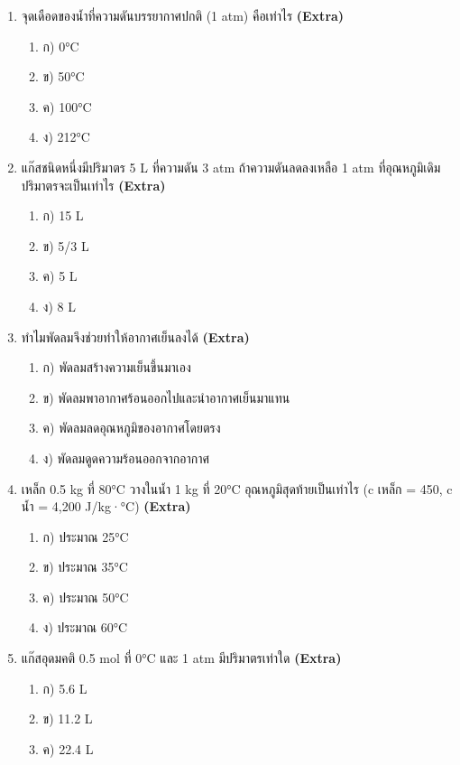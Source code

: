 \documentclass[12pt]{article}
\begin{document}
\begin{enumerate}[label=\arabic*.]
\begin{enumerate}[label=)]
\item ค) 49.2 L
\item ง) 6.15 L
\end{enumerate}
\item จุดเดือดของน้ำที่ความดันบรรยากาศปกติ (1 atm) คือเท่าไร \hfill \textbf{\small (Extra)}
\begin{enumerate}[label=)]
\item ก) 0°C
\item ข) 50°C
\item ค) 100°C
\item ง) 212°C
\end{enumerate}
\item แก๊สชนิดหนึ่งมีปริมาตร 5 L ที่ความดัน 3 atm ถ้าความดันลดลงเหลือ 1 atm ที่อุณหภูมิเดิม ปริมาตรจะเป็นเท่าไร \hfill \textbf{\small (Extra)}
\begin{enumerate}[label=)]
\item ก) 15 L
\item ข) 5/3 L
\item ค) 5 L
\item ง) 8 L
\end{enumerate}
\item ทำไมพัดลมจึงช่วยทำให้อากาศเย็นลงได้ \hfill \textbf{\small (Extra)}
\begin{enumerate}[label=)]
\item ก) พัดลมสร้างความเย็นขึ้นมาเอง
\item ข) พัดลมพาอากาศร้อนออกไปและนำอากาศเย็นมาแทน
\item ค) พัดลมลดอุณหภูมิของอากาศโดยตรง
\item ง) พัดลมดูดความร้อนออกจากอากาศ
\end{enumerate}
\item เหล็ก 0.5 kg ที่ 80°C วางในน้ำ 1 kg ที่ 20°C อุณหภูมิสุดท้ายเป็นเท่าไร (c เหล็ก = 450, c น้ำ = 4,200 J/kg·°C) \hfill \textbf{\small (Extra)}
\begin{enumerate}[label=)]
\item ก) ประมาณ 25°C
\item ข) ประมาณ 35°C
\item ค) ประมาณ 50°C
\item ง) ประมาณ 60°C
\end{enumerate}
\item แก๊สอุดมคติ 0.5 mol ที่ 0°C และ 1 atm มีปริมาตรเท่าใด \hfill \textbf{\small (Extra)}
\begin{enumerate}[label=)]
\item ก) 5.6 L
\item ข) 11.2 L
\item ค) 22.4 L

\end{enumerate}
\end{enumerate}
\end{document}
